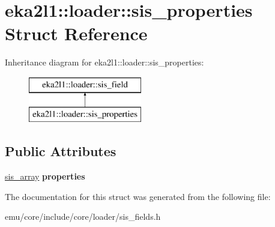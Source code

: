 \hypertarget{structeka2l1_1_1loader_1_1sis__properties}{}\section{eka2l1\+:\+:loader\+:\+:sis\+\_\+properties Struct Reference}
\label{structeka2l1_1_1loader_1_1sis__properties}
Inheritance diagram for eka2l1\+:\+:loader\+:\+:sis\+\_\+properties\+:\begin{figure}[H]
\begin{center}
\leavevmode
\includegraphics[height=2.000000cm]{structeka2l1_1_1loader_1_1sis__properties}
\end{center}
\end{figure}
\subsection*{Public Attributes}
\begin{DoxyCompactItemize}
\item 
\mbox{\label{structeka2l1_1_1loader_1_1sis__properties_a63238eea01ad6a158fd8b9a178460247}} 
\mbox{\hyperlink{structeka2l1_1_1loader_1_1sis__array}{sis\+\_\+array}} {\bfseries properties}
\end{DoxyCompactItemize}


The documentation for this struct was generated from the following file\+:\begin{DoxyCompactItemize}
\item 
emu/core/include/core/loader/sis\+\_\+fields.\+h\end{DoxyCompactItemize}
